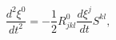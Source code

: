 \begin{equation}
\frac{d^{2}\xi^{0}}{dt^{2}}=-\frac{1}{2}R_{jkl}^{0}\frac{d\xi^{j}}{dt}S^{kl},
\label{40}
\end{equation}

